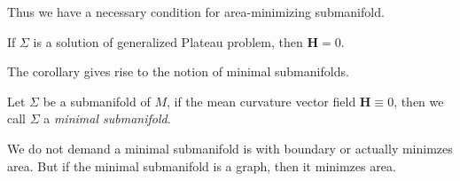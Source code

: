 Thus we have a necessary condition for area-minimizing submanifold.
\begin{cor}
    If $\Sigma$ is a solution of generalized Plateau problem, then $\mathbf{H}=0$.
\end{cor}

The corollary gives rise to the notion of minimal submanifolds.

\begin{defn}
    Let $\Sigma$ be a submanifold of $M$, if the mean curvature vector field $\mathbf{H}\equiv 0$, then we call $\Sigma$ a \emph{minimal submanifold}.
\end{defn}

\begin{rem}
    We do not demand a minimal submanifold is with boundary or actually minimzes area.
    But if the minimal submanifold is a graph, then it minimzes area.
\end{rem}

